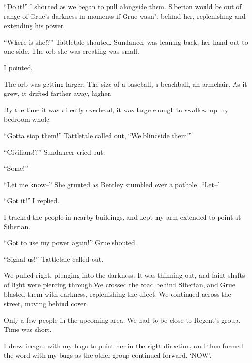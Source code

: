 ``Do it!''  I shouted as we began to pull alongside them.  Siberian would be out of range of Grue's darkness in moments if Grue wasn't behind her, replenishing and extending his power.



``Where is she!?''  Tattletale shouted.  Sundancer was leaning back, her hand out to one side.  The orb she was creating was small.



I pointed.



The orb was getting larger.  The size of a baseball, a beachball, an armchair.  As it grew, it drifted farther away, higher.



By the time it was directly overhead, it was large enough to swallow up my bedroom whole.



``Gotta stop them!''  Tattletale called out, ``We blindside them!''



``Civilians!?''  Sundancer cried out.



``Some!''



``Let me know--''  She grunted as Bentley stumbled over a pothole.  ``Let--''



``Got it!''  I replied.



I tracked the people in nearby buildings, and kept my arm extended to point at Siberian.



``Got to use my power again!''  Grue shouted.



``Signal us!''  Tattletale called out.



We pulled right, plunging into the darkness.  It was thinning out, and faint shafts of light were piercing through.We crossed the road behind Siberian, and Grue blasted them with darkness, replenishing the effect.  We continued across the street, moving behind cover.



Only a few people in the upcoming area.  We had to be close to Regent's group.  Time was short.



I drew images with my bugs to point her in the right direction, and then formed the word with my bugs as the other group continued forward.  `NOW'.



